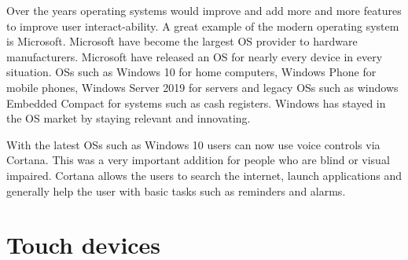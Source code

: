 Over the years operating systems would improve and add more and more features to improve user interact-ability. A great example of the modern operating system is Microsoft. Microsoft have become the largest OS provider to hardware manufacturers. Microsoft have released an OS for nearly every device in every situation. OSs such as Windows 10 for home computers, Windows Phone for mobile phones, Windows Server 2019 for servers and legacy OSs such as windows Embedded Compact for systems such as cash registers. Windows has stayed in the OS market by staying relevant and innovating.

With the latest OSs such as Windows 10 users can now use voice controls via Cortana. This was a very important addition for people who are blind or visual impaired. Cortana allows the users to search the internet, launch applications and generally help the user with basic tasks such as reminders and alarms.

\section{Touch devices}

